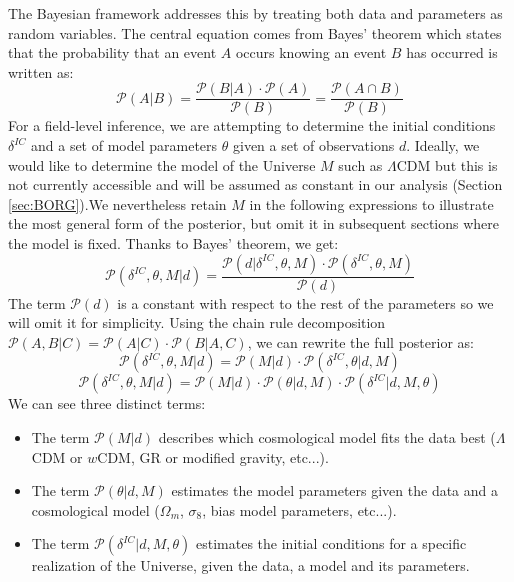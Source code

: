 The Bayesian framework addresses this by treating both data and parameters 
as random variables. The central equation comes from Bayes' theorem which states that the probability that an event $A$ occurs knowing an event $B$ has occurred is written as:
\begin{equation}
    \mathcal{P}(A|B) = \frac{\mathcal{P}(B|A) \cdot \mathcal{P}(A)}{\mathcal{P}(B)} = \frac{\mathcal{P}(A \cap  B)}{\mathcal{P}(B)}
\end{equation}
For a field-level inference, we are attempting to determine the initial conditions $\delta^{IC}$ and a set of model parameters $\theta$ given a set of observations $d$.
Ideally, we would like to determine the model of the Universe $M$ such as $\Lambda$CDM but this is not currently accessible and will be 
assumed as constant in our analysis (Section \ref{sec:BORG}).We nevertheless retain $M$ in the following expressions to illustrate 
the most general form of the posterior, but omit it in subsequent sections where the model is fixed. Thanks to Bayes' theorem, we get: 
\begin{equation}
    \mathcal{P}(\delta^{IC}, \theta, M | d) = \frac{\mathcal{P}(d | \delta^{IC}, \theta, M) \cdot \mathcal{P}(\delta^{IC}, \theta, M)}{\mathcal{P}(d)}
\end{equation}
The term $\mathcal{P}(d)$ is a constant with respect to the rest of the parameters so we will omit it for simplicity. 
Using the chain rule decomposition $\mathcal{P}(A, B|C) = \mathcal{P}(A|C) \cdot \mathcal{P}(B|A, C)  $, we can rewrite the full posterior as:
\begin{equation}
    \mathcal{P}(\delta^{IC}, \theta, M | d) = \mathcal{P}(M | d) \cdot \mathcal{P}(\delta^{IC}, \theta | d, M)
\end{equation}
\begin{equation}
    \mathcal{P}(\delta^{IC}, \theta, M | d) = \mathcal{P}(M | d) \cdot \mathcal{P}(\theta | d, M) \cdot \mathcal{P}(\delta^{IC} | d, M, \theta)
    \label{eqn:bayesian_borg}
\end{equation}
We can see three distinct terms:
\begin{itemize}
    \item The term $\mathcal{P}(M | d)$ describes which cosmological model fits the data best ($\Lambda$CDM or $w$CDM, GR or modified gravity, etc...). 
    \item The term $\mathcal{P}(\theta | d, M)$ estimates the model parameters given the data and a cosmological model ($\Omega_m$, $\sigma_8$, bias model parameters, etc...).
    \item The term $\mathcal{P}(\delta^{IC} | d, M, \theta)$ estimates the initial conditions for a specific realization of the Universe, given the data, a model and its parameters.
\end{itemize}
